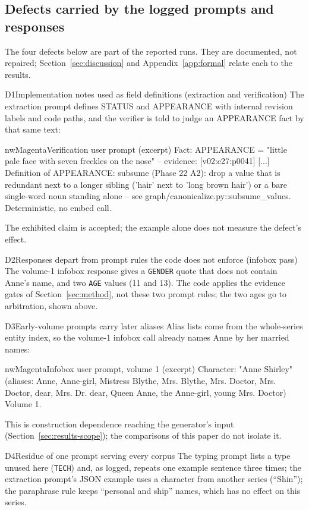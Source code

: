 \subsection*{Defects carried by the logged prompts and responses}
The four defects below are part of the reported runs. They are documented, not repaired;
Section~\ref{sec:discussion} and Appendix~\ref{app:formal} relate each to the results.

\begin{nwdefect}{D1\enspace Implementation notes used as field definitions (extraction and verification)}
The extraction prompt defines STATUS and APPEARANCE with internal revision labels and code
paths, and the verifier is told to judge an APPEARANCE fact by that same text:
\begin{nwprompt}{nwMagenta}{Verification user prompt (excerpt)}
Fact: APPEARANCE = "little pale face with seven freckles on the nose" -- evidence: [v02:c27:p0041] [...]
Definition of APPEARANCE: subsume (Phase 22 A2): drop a value that is redundant next to a longer sibling ('hair' next to 'long brown hair') or a bare single-word noun standing alone -- see graph/canonicalize.py::subsume_values. Deterministic, no embed call.
\end{nwprompt}
The exhibited claim is accepted; the example alone does not measure the defect's effect.
\end{nwdefect}

\begin{nwdefect}{D2\enspace Responses depart from prompt rules the code does not enforce (infobox pass)}
The volume-1 infobox response gives a \texttt{GENDER} quote that does not contain Anne's
name, and two \texttt{AGE} values (11 and 13). The code applies the evidence gates of
Section~\ref{sec:method}, not these two prompt rules; the two ages go to arbitration, shown
above.
\end{nwdefect}

\begin{nwdefect}{D3\enspace Early-volume prompts carry later aliases}
Alias lists come from the whole-series entity index, so the volume-1 infobox call already
names Anne by her married names:
\begin{nwprompt}{nwMagenta}{Infobox user prompt, volume 1 (excerpt)}
Character: "Anne Shirley" (aliases: Anne, Anne-girl, Mistress Blythe, Mrs. Blythe, Mrs. Doctor, Mrs. Doctor, dear, Mrs. Dr. dear, Queen Anne, the Anne-girl, young Mrs. Doctor)
Volume 1.
\end{nwprompt}
This is construction dependence reaching the generator's input
(Section~\ref{sec:results-scope}); the comparisons of this paper do not isolate it.
\end{nwdefect}

\begin{nwdefect}{D4\enspace Residue of one prompt serving every corpus}
The typing prompt lists a type unused here (\texttt{TECH}) and, as logged, repeats one example
sentence three times; the extraction prompt's JSON example uses a character from another
series (``Shin''); the paraphrase rule keeps ``personal and ship'' names, which has no effect
on this series.
\end{nwdefect}
\endgroup
